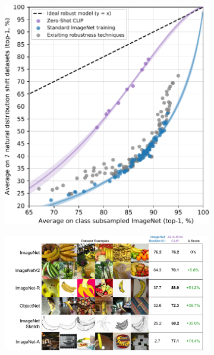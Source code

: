 \begin{description}
\begin{remark}
            \begin{figure}[H]
                \centering
                \begin{subfigure}{0.35\linewidth}
                    \centering
                    \includegraphics[width=\linewidth]{./img/_clip_resnet_distributional_shift.pdf}
                \end{subfigure}
                \hfill
                \begin{subfigure}{0.6\linewidth}
                    \centering
                    \includegraphics[width=\linewidth]{./img/_clip_resnet_distributional_shift_datasets.pdf}
                \end{subfigure}
            \end{figure}
        \end{remark}
\end{description}

